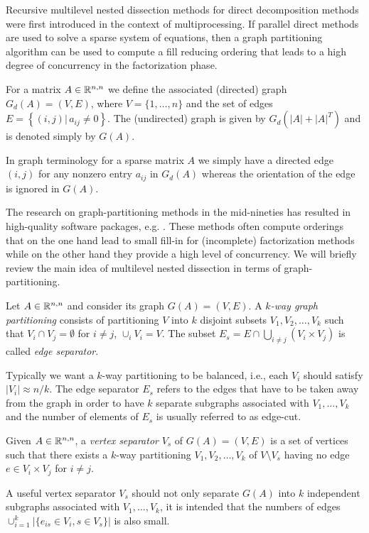 \label{subsec:mnd}
Recursive multilevel nested dissection methods for direct
decomposition methods were first introduced in the context of
multiprocessing. If parallel direct methods are used to solve a sparse
system of equations, then a graph partitioning algorithm can be used
to compute a fill reducing ordering that leads to a high degree of
concurrency in the factorization phase. 
\begin{definition}\label{def:matrix-graph}
For a matrix $A\in\mathbb{R}^{n,n}$ we
 define the associated (directed) graph $G_d(A)=(V,E)$, where 
$V=\{1,\dots,n\}$ and the set of edges 
$E=\left\{(i,j)|\, a_{ij}\not=0\right\}$.
The (undirected) graph is given by  $G_d(|A|+|A|^T)$ and is denoted
simply by $G(A)$.
\end{definition}
In graph terminology for a sparse matrix $A$ we simply have a directed
edge $(i,j)$ for any nonzero entry $a_{ij}$ in $G_d(A)$ whereas the 
orientation of the edge is ignored in $G(A)$.

The research on graph-partitioning
methods in the mid-nineties has resulted in high-quality software
packages, e.g. \metis {} \cite{karypis:98}.
These methods often compute orderings that on the one hand lead to small fill-in 
for (incomplete) factorization methods while on the other hand they
provide a high level of concurrency.
We will briefly review the main idea of multilevel nested dissection in
terms of graph-partitioning.
\begin{definition}\label{def:partitioning-and-separator}
Let $A\in\mathbb{R}^{n,n}$
and consider its graph $G(A)=(V,E)$. 
A \emph{$k$-way graph partitioning} consists of 
partitioning $V$ into $k$ disjoint subsets
$V_1, V_2, \ldots, V_k$ such that $V_i \cap V_j = \emptyset$ for $i
\ne j$, $\cup_i V_i=V$.
The subset $E_s = E\cap \bigcup_{i\not=j} (V_i\times V_j)$ is called 
\emph{edge separator}.
\end{definition}
Typically we want a $k$-way partitioning to be balanced, i.e., 
each $V_i$ should satisfy $|V_i|\approx n/k$. The edge separator $E_s$
refers to the edges that have to be taken away from the graph
in order to have $k$ separate
subgraphs associated with $V_1,\dots,V_k$ and the number of elements of
$E_s$ is usually referred to as edge-cut. 

\begin{definition}\label{def:vertex-separator}
Given $A\in\mathbb{R}^{n,n}$,
    a \emph{vertex separator} $V_s$ of $G(A)= (V,E)$ is a
    set of vertices such that there exists a $k$-way partitioning 
    $V_1, V_2, \ldots, V_k$ of $V \setminus V_s$ having no edge
    $e\in V_i\times V_j$ for $i\ne j$. 
\end{definition}
A useful vertex separator $V_s$ should not only separate $G(A)$ into
$k$ independent subgraphs associated with $V_1,\dots,V_k$, it is 
intended that the numbers of edges 
$\cup_{i=1}^{k} |\{ e_{is} \in V_i, s \in V_s\}| $ is also small.



